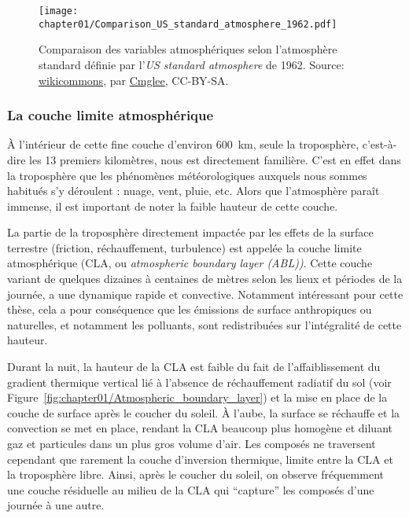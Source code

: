\begin{figure}[ht]
    \centering
    \texttt{[image: chapter01/Comparison\_US\_standard\_atmosphere\_1962.pdf]}
    \caption{%
        Comparaison des variables atmosphériques selon l'atmosphère standard définie par
        l'\textit{US standard atmosphere} de 1962.
        Source:
        \href{https://commons.wikimedia.org/wiki/File:Comparison_US_standard_atmosphere_1962.svg}{wikicommons},
        par \href{https://commons.wikimedia.org/wiki/User:Cmglee}{Cmglee}, CC-BY-SA.
    }%
    \label{fig:chapter01/Comparison_US_standard_atmosphere_1962}
\end{figure}

\subsubsection{La couche limite atmosphérique}%
\label{sub:la_couche_limite_atmospherique}

À l'intérieur de cette fine couche d'environ \SI{600}{km}, seule la troposphère,
c'est-à-dire les 13 premiers kilomètres, nous est directement familière. C'est en effet
dans la troposphère que les phénomènes météorologiques auxquels nous sommes habitués s'y
déroulent : nuage, vent, pluie, etc. Alors que l'atmosphère paraît immense, il est
important de noter la faible hauteur de cette couche.

La partie de la troposphère directement impactée par les effets de la surface terrestre
(friction, réchauffement, turbulence) est appelée la couche limite atmosphérique (CLA, ou
\textit{atmospheric boundary layer (ABL))}. Cette couche variant de quelques dizaines à centaines
de mètres selon les lieux et périodes de la journée, a une dynamique rapide et
convective. Notamment intéressant pour cette thèse, cela a pour conséquence que les
émissions de surface anthropiques ou naturelles, et notamment les polluants, sont
redistribuées sur l'intégralité de cette hauteur.

Durant la nuit, la hauteur de la CLA est faible du fait de l'affaiblissement du
gradient thermique vertical lié à l'absence de réchauffement radiatif du sol (voir
Figure~\ref{fig:chapter01/Atmospheric_boundary_layer}) et la mise en place de la couche de
surface après le coucher du soleil. À l'aube, la surface se réchauffe et la
convection se met en place, rendant la CLA beaucoup plus homogène et diluant gaz et
particules dans un plus gros volume d'air. Les composés ne traversent cependant que
rarement la couche d'inversion thermique, limite entre la CLA et la troposphère libre.
Ainsi, après le coucher du soleil, on observe fréquemment une couche résiduelle au milieu de
la CLA qui ``capture'' les composés d'une journée à une autre.


